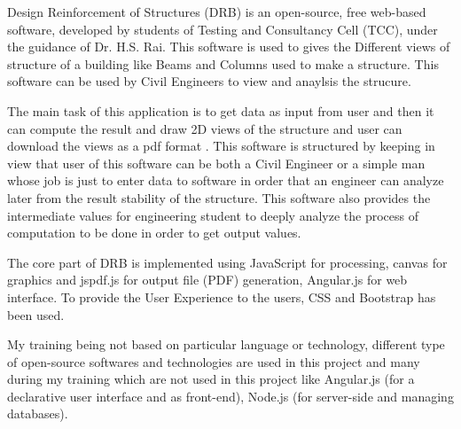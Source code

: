Design Reinforcement of Structures (DRB) is an open-source, free web-based software, developed by students of 
Testing and Consultancy Cell (TCC), under the guidance of Dr. H.S. Rai. This software is used to gives the 
Different views of structure of a building like Beams and Columns used to make a structure. This software can be used by Civil Engineers to view and anaylsis the strucure.

 The main task of this application is to get data as input from user and then it can compute 
the result and draw 2D views of the structure and user can download the views as a pdf format .
This software is structured by keeping in view that user of this software can be both 
a Civil Engineer or a simple man whose job is just to enter data to software 
in order that an engineer can analyze later from the result stability of the structure.
This software also provides the intermediate values for engineering student 
to deeply analyze the process of computation to be done in order to get output values.


The core part of DRB is implemented using JavaScript for processing, canvas for graphics and  jspdf.js for output file (PDF) generation, Angular.js 
for web interface. To provide the User Experience to the users, 
CSS and Bootstrap has been used.


My training being not based on particular language or technology, different type of open-source softwares and technologies are 
used in this project and many during my training which are not used in this 
project like Angular.js (for a declarative user interface and as front-end), Node.js (for server-side and managing databases).
